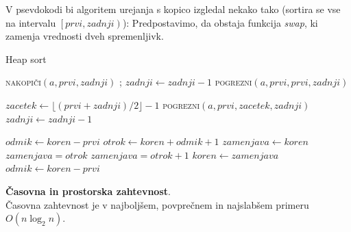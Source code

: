 \documentclass[a4paper,oneside]{article}
\begin{document}
V psevdokodi bi algoritem urejanja s kopico izgledal nekako tako (sortira se vse na intervalu
$\left[prvi, zadnji\right)$):
Predpostavimo, da obstaja funkcija \emph{swap}, ki zamenja vrednosti dveh spremenljivk.

\begin{algorithm}
  \caption{Heap sort}\label{algo:heapsort}
  \begin{algorithmic}[1]
        \State \textsc{nakopiči}$(a, prvi, zadnji)$
            ;
            \State $zadnji \gets zadnji - 1$
            \State \textsc{pogrezni}$(a, prvi, prvi, zadnji)$
        \EndWhile
    \EndFunction
  \end{algorithmic}

  \begin{algorithmic}[1]
        \State $zacetek \gets \lfloor(prvi + zadnji) / 2\rfloor - 1$
         
            \State \textsc{pogrezni}$(a, prvi, zacetek, zadnji)$
            \State $zadnji \gets zadnji - 1$
        \EndWhile
    \EndFunction
  \end{algorithmic}

  \begin{algorithmic}[1]
        \State $odmik \gets koren - prvi$
         
            \State $otrok \gets koren + odmik + 1$
            \State $zamenjava \gets koren$ 
             
            \State $zamenjava = otrok$
            \EndIf {}
                \State $zamenjava = otrok + 1$
            \EndIf
                \State $koren \gets zamenjava$
            \Else \Return 
            \State $odmik \gets koren - prvi$
            \EndIf
        \EndWhile
    \EndFunction
  \end{algorithmic}
\end{algorithm}

\textbf{Časovna in prostorska zahtevnost}. \\
Časovna zahtevnost je v najboljšem, povprečnem in najslabšem primeru $O(n\log_2 n)$.
\end{document}
